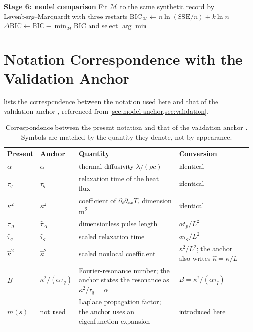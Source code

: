 \documentclass[preprint,12pt,a4paper]{elsarticle}
\theoremstyle{plain}
\theoremstyle{definition}
\theoremstyle{remark}
\newcommand{\tq}{\tau_{q}}
\newcommand{\kk}{\kappa^{2}}
\newcommand{\Bnum}{B}
\begin{document}
\begin{algorithm}[htbp]
\begin{algorithmic}[1]
\Statex \textbf{Stage 6: model comparison}
  \State Fit $\mathcal{M}$ to the same synthetic record by
         Levenberg--Marquardt with three restarts
  \State $\mathrm{BIC}_{\mathcal{M}} \gets n\ln(\mathrm{SSE}/n) + k\ln n$
\EndFor
\State $\Delta\mathrm{BIC} \gets \mathrm{BIC} - \min_{\mathcal{M}}\mathrm{BIC}$
       and select $\arg\min$
\end{algorithmic}
\end{algorithm}


\clearpage
\section{Notation Correspondence with the Validation Anchor}
\setcounter{table}{0}
\label{app:notation}

 lists the correspondence between the notation used
here and that of the validation anchor \cite{Kovacs2018}, referenced from
\cref{sec:model-anchor,sec:validation}.


\begin{table}[htbp]
  \centering
  \caption{Correspondence between the present notation and that of the
           validation anchor \cite{Kovacs2018}. Symbols are matched by the
           quantity they denote, not by appearance.}
  \label{tab:notation}
  \small
  \begin{tabularx}{\textwidth}{@{}llXl@{}}
    \toprule
    \textbf{Present} & \textbf{Anchor} & \textbf{Quantity} &
    \textbf{Conversion} \\
    \midrule
    $\alpha$              & $\alpha$            &
      thermal diffusivity $\lambda/(\rho c)$ & identical \\
    $\tq$                 & $\tau_{q}$          &
      relaxation time of the heat flux & identical \\
    $\kk$                 & $\kappa^{2}$        &
      coefficient of $\partial_{t}\partial_{xx}T$, dimension
      \si{\metre\squared} & identical \\
    $\tau_{\Delta}$       & $\hat{\tau}_{\Delta}$ &
      dimensionless pulse length & $\alpha t_{p}/L^{2}$ \\
    $\hat{\tau}_{q}$      & $\hat{\tau}_{q}$    &
      scaled relaxation time & $\alpha \tq/L^{2}$ \\
    $\hat{\kappa}^{2}$    & $\hat{\kappa}^{2}$  &
      scaled nonlocal coefficient & $\kk/L^{2}$; the anchor also
      writes $\hat{\kappa}=\kappa/L$ \\
    $\Bnum$               & $\kappa^{2}/(\alpha\tau_{q})$ &
      Fourier-resonance number; the anchor states the resonance as
      $\kappa^{2}/\tau_{q}=\alpha$ & $\Bnum = \kk/(\alpha\tq)$ \\
    $m(s)$                & not used            &
      Laplace propagation factor; the anchor uses an eigenfunction
      expansion & introduced here \\
    \bottomrule
  \end{tabularx}
\end{table}
\end{document}
